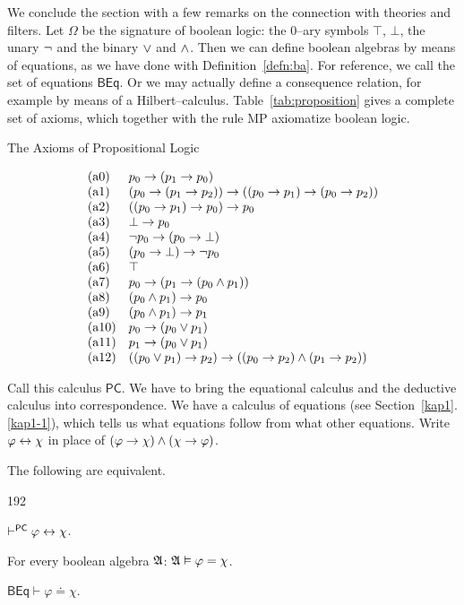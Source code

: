 We conclude the section with a few remarks on the connection
with theories and filters. Let $\Omega$ be the signature of
boolean logic: the 0--ary symbols $\top$, $\bot$, the unary
$\neg$ and the binary $\vee$ and $\wedge$. Then we can define
boolean algebras by means of equations, as we have done with
Definition~\ref{defn:ba}. For reference, we call the set of
equations $\mathsf{BEq}$. Or we may actually define a consequence
relation, for example by means of a Hilbert--calculus.
Table~\ref{tab:proposition} gives a complete set of axioms,
which together with the rule MP axiomatize boolean logic.
\begin{table}
\caption{The Axioms of Propositional Logic}
\label{tab:proposition}
$$\begin{array}{l@{\quad}l}
\mbox{\rm (a0)} & p_0 \pf (p_1 \pf p_0) \\
\mbox{\rm (a1)} & (p_0 \pf (p_1 \pf p_2)) \pf ((p_0 \pf p_1) \pf
    (p_0 \pf p_2)) \\
\mbox{\rm (a2)} &
    ((p_0 \pf p_1) \pf p_0) \pf p_0 \\
\mbox{\rm (a3)} &
    \bot \pf p_0 \\
\mbox{\rm (a4)} &
    \nicht p_0 \pf (p_0 \pf \bot) \\
\mbox{\rm (a5)} &
    (p_0 \pf \bot) \pf \nicht p_0 \\
\mbox{\rm (a6)} & \top \\
\mbox{\rm (a7)} &
    p_0 \pf (p_1 \pf (p_0 \und p_1)) \\
\mbox{\rm (a8)} &
    (p_0 \und p_1) \pf p_0 \\
\mbox{\rm (a9)} &
    (p_0 \und p_1) \pf p_1 \\
\mbox{\rm (a10)} &
    p_0 \pf (p_0 \oder p_1) \\
\mbox{\rm (a11)} &
    p_1 \pf (p_0 \oder p_1) \\
\mbox{\rm (a12)} &
    ((p_0 \oder p_1) \pf p_2) \pf ((p_0 \pf p_2) \und
    (p_1 \pf p_2))
\end{array}$$
\end{table}
Call this calculus $\mathsf{PC}$.  We have to bring the equational
calculus and the deductive calculus into correspondence. We have
a calculus of equations (see Section~\ref{kap1}.\ref{kap1-1}), which tells
us what equations follow from what other equations. Write
$\varphi \leftrightarrow \chi$ in place of $(\varphi \rightarrow \chi) \wedge
(\chi \rightarrow \varphi)$.
\begin{thm}
\label{thm:eqtovdash}
The following are equivalent.
\begin{dingautolist}{192}
\item
$\vdash^{\mathsf{PC}} \varphi \leftrightarrow \chi$.
\item
For every boolean algebra $\mathfrak{A}$:
$\mathfrak{A} \vDash \varphi = \chi$.
\item
$\mathsf{BEq} \vdash \varphi \doteq \chi$.
\end{dingautolist}
\end{thm}
